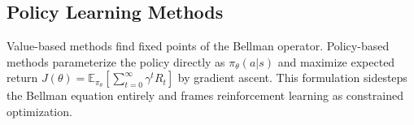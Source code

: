 


\subsection{Policy Learning Methods}
\label{sec:policy_gradient}

Value-based methods find fixed points of the Bellman operator. Policy-based methods parameterize the policy directly as $\pi_\theta(a|s)$ and maximize expected return $J(\theta) = \mathbb{E}_{\pi_\theta}[\sum_{t=0}^\infty \gamma^t R_t]$ by gradient ascent. This formulation sidesteps the Bellman equation entirely and frames reinforcement learning as constrained optimization.


